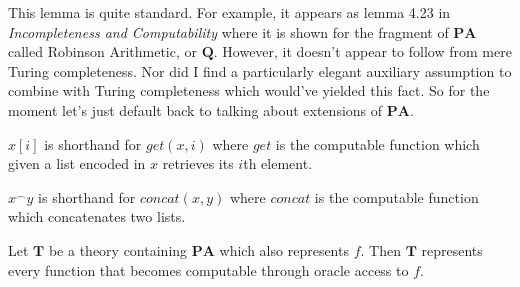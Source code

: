 \documentclass{article}
\theoremstyle{customstyle}
\newcommand{\T}{\mathbf{T}}
\newcommand{\PA}{\mathbf{PA}}
\begin{document}
This lemma is quite standard. For example, it appears as lemma 4.23 in \textit{Incompleteness and Computability} \cite{zach} where it is shown for the fragment of $\PA$ called Robinson Arithmetic, or $\mathbf{Q}$. However, it doesn't appear to follow from mere Turing completeness. Nor did I find a particularly elegant auxiliary assumption to combine with Turing completeness which would've yielded this fact. So for the moment let's just default back to talking about extensions of $\PA$.

\begin{definition}
$x[i]$ is shorthand for $\mathit{get}(x,i)$ where $\mathit{get}$ is the computable function which given a list encoded in $x$ retrieves its $i$th element.
\end{definition}

\begin{definition}
$x^\frown y$ is shorthand for $\mathit{concat}(x,y)$ where $\mathit{concat}$ is the computable function which concatenates two lists.
\end{definition}

\begin{lemma}
Let $\T$ be a theory containing $\PA$ which also represents $f$. Then $\T$ represents every function that becomes computable through oracle access to $f$.
\end{lemma}
\end{document}

